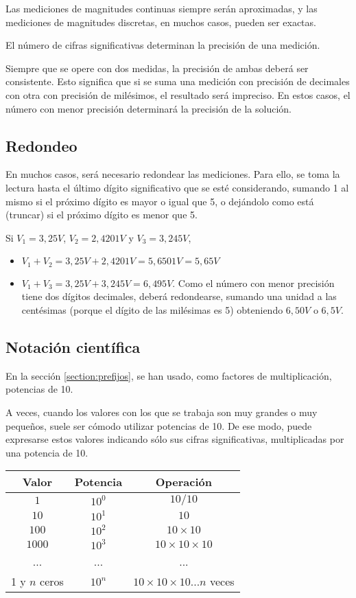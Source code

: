 Las mediciones de magnitudes continuas siempre serán aproximadas, y las mediciones de magnitudes discretas, en muchos casos, pueden ser exactas.

El número de cifras significativas determinan la precisión de una medición.

Siempre que se opere con dos medidas, la precisión de ambas deberá ser consistente. Esto significa que si se suma una medición con precisión de decimales con otra con precisión de milésimos, el resultado será impreciso. En estos casos, el número con menor precisión determinará la precisión de la solución.
\subsection{Redondeo}
En muchos casos, será necesario redondear las mediciones. Para ello, se toma la lectura hasta el último dígito significativo que se esté considerando, sumando 1 al mismo si el próximo dígito es mayor o igual que 5, o dejándolo como está (truncar) si el próximo dígito es menor que 5.

\begin{ejemplo}
Si $V_1=3,25 V$, $V_2=2,4201 V$ y $V_3=3,245V$, 
	\begin{itemize}
		\item $V_1+V_2=3,25 V + 2,4201 V=5,6501 V=5,65 V$
		\item $V_1+V_3=3,25 V + 3,245 V = 6,495 V $. Como el número con menor precisión tiene dos dígitos decimales, deberá redondearse, sumando una unidad a las centésimas (porque el dígito de las milésimas es 5) obteniendo $6,50 V$ o $6,5V$.
	\end{itemize}
\end{ejemplo}
\subsection{Notación científica}
En la sección \ref{section:prefijos}, se han usado, como factores de multiplicación, potencias de 10.

A veces, cuando los valores con los que se trabaja son muy grandes o muy pequeños, suele ser cómodo utilizar potencias de 10. De ese modo, puede expresarse estos valores indicando sólo sus cifras significativas, multiplicadas por una potencia de 10.

\begin{tabular}{|c|c|c|}
\hline 
Valor & Potencia & Operación \\ 
\hline 
$1$ & $10^0$ & $10/10$ \\ 
\hline 
$10$ & $10^1$ & $10$ \\ 
\hline 
$100$ & $10^2$ & $10 \times 10$ \\ 
\hline 
$1000$ & $10^3$ & $10 \times 10 \times 10$ \\ 
\hline 
... & ... & ... \\ 
\hline 
1 y $n$ ceros & $10^n$ & $10 \times 10 \times 10 ... n$ veces \\ 
\hline 
\end{tabular} 

